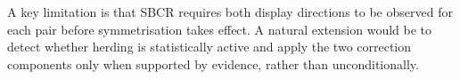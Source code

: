 \documentclass[12pt,a4paper]{article}
\begin{document}
A key limitation is that SBCR requires both display directions to be observed for
each pair before symmetrisation takes effect.  A natural extension would be to
detect whether herding is statistically active and apply the two correction
components only when supported by evidence, rather than unconditionally.



\end{document}
